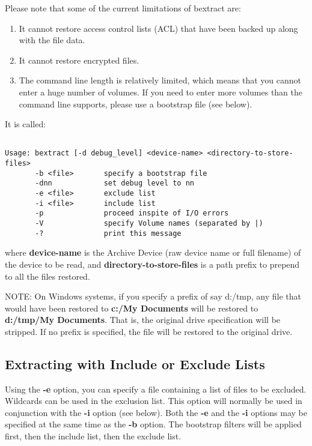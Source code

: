 Please note that some of the current limitations of bextract are:

\begin{enumerate}
\item It cannot restore access control lists (ACL) that have been
      backed up along with the file data.
\item It cannot restore encrypted files.
\item The command line length is relatively limited,
      which means that you cannot enter a huge number of volumes.  If you need to
      enter more volumes than the command line supports, please use a bootstrap
      file (see below).
\end{enumerate}


It is called:

\footnotesize
\begin{verbatim}

Usage: bextract [-d debug_level] <device-name> <directory-to-store-files>
       -b <file>       specify a bootstrap file
       -dnn            set debug level to nn
       -e <file>       exclude list
       -i <file>       include list
       -p              proceed inspite of I/O errors
       -V              specify Volume names (separated by |)
       -?              print this message
\end{verbatim}
\normalsize

where {\bf device-name} is the Archive Device (raw device name or full
filename) of the device to be read, and {\bf directory-to-store-files} is a
path prefix to prepend to all the files restored.

NOTE: On Windows systems, if you specify a prefix of say d:/tmp, any file that
would have been restored to {\bf c:/My Documents} will be restored to {\bf
d:/tmp/My Documents}. That is, the original drive specification will be
stripped. If no prefix is specified, the file will be restored to the original
drive.

\subsection{Extracting with Include or Exclude Lists}

Using the {\bf -e} option, you can specify a file containing a list of files
to be excluded. Wildcards can be used in the exclusion list. This option will
normally be used in conjunction with the {\bf -i} option (see below). Both the
{\bf -e} and the {\bf -i} options may be specified at the same time as the
{\bf -b} option. The bootstrap filters will be applied first, then the include
list, then the exclude list.

